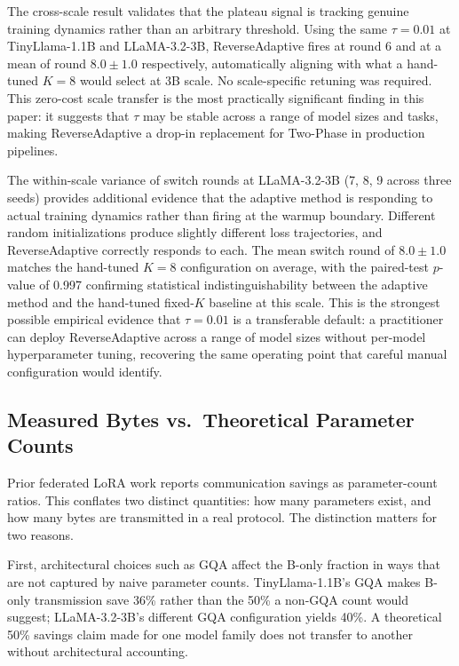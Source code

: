 The cross-scale result validates that the plateau signal is tracking genuine training dynamics rather than an arbitrary threshold. Using the same $\tau{=}0.01$ at TinyLlama-1.1B and LLaMA-3.2-3B, ReverseAdaptive fires at round 6 and at a mean of round $8.0 \pm 1.0$ respectively, automatically aligning with what a hand-tuned $K{=}8$ would select at 3B scale. No scale-specific retuning was required. This zero-cost scale transfer is the most practically significant finding in this paper: it suggests that $\tau$ may be stable across a range of model sizes and tasks, making ReverseAdaptive a drop-in replacement for Two-Phase in production pipelines.

The within-scale variance of switch rounds at LLaMA-3.2-3B (7, 8, 9 across three seeds) provides additional evidence that the adaptive method is responding to actual training dynamics rather than firing at the warmup boundary. Different random initializations produce slightly different loss trajectories, and ReverseAdaptive correctly responds to each. The mean switch round of $8.0 \pm 1.0$ matches the hand-tuned $K{=}8$ configuration on average, with the paired-test $p$-value of 0.997 confirming statistical indistinguishability between the adaptive method and the hand-tuned fixed-$K$ baseline at this scale. This is the strongest possible empirical evidence that $\tau{=}0.01$ is a transferable default: a practitioner can deploy ReverseAdaptive across a range of model sizes without per-model hyperparameter tuning, recovering the same operating point that careful manual configuration would identify.

\subsection{Measured Bytes vs.\ Theoretical Parameter Counts}
Prior federated LoRA work \citep{zhang2024federatedgpt,sun2024ffalora,wang2024flora,bai2024flexlora} reports communication savings as parameter-count ratios. This conflates two distinct quantities: how many parameters exist, and how many bytes are transmitted in a real protocol. The distinction matters for two reasons.

First, architectural choices such as GQA affect the B-only fraction in ways that are not captured by naive parameter counts. TinyLlama-1.1B's GQA makes B-only transmission save 36\% rather than the 50\% a non-GQA count would suggest; LLaMA-3.2-3B's different GQA configuration yields 40\%. A theoretical 50\% savings claim made for one model family does not transfer to another without architectural accounting.

